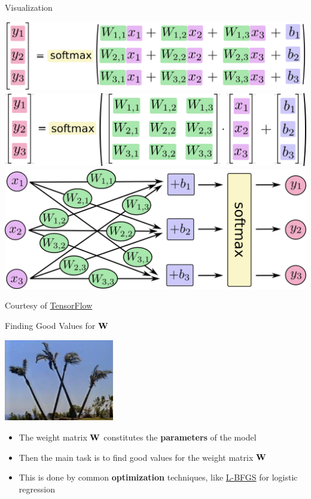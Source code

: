 \documentclass[xcolor=pdftex,x11names,table,hyperref]{beamer}
\begin{document}
\begin{frame}{Visualization}
\vspace{0.7em}
	\begin{center}
	\includegraphics[height=0.19\textheight]{images/softmax-regression-scalarequation.png} \\[1.1em]
	\includegraphics[height=0.19\textheight]{images/softmax-regression-vectorequation.png} \\[1.1em]
	\pause
	\includegraphics[height=0.29\textheight]{images/softmax-regression-scalargraph.png}
	\end{center}
\vspace{0.5em}
{\tiny Courtesy of \href{http://www.tensorflow.org/tutorials}{TensorFlow}}
\end{frame}


\begin{frame}{Finding Good Values for $\bf W$}
	\begin{center}
	\includegraphics[width=0.36\textwidth]{images/big-w.jpg}
	\end{center}
\begin{itemize}
	\item The weight matrix $\bf W$ constitutes the \textbf{parameters} of the model
	\item Then the main task is to find good values for the weight matrix $\bf W$
	\item This is done by common \textbf{optimization} techniques, like \href{https://en.wikipedia.org/wiki/Limited-memory_BFGS}{L-BFGS} for logistic regression
\end{itemize}
\end{frame}
\end{document}
